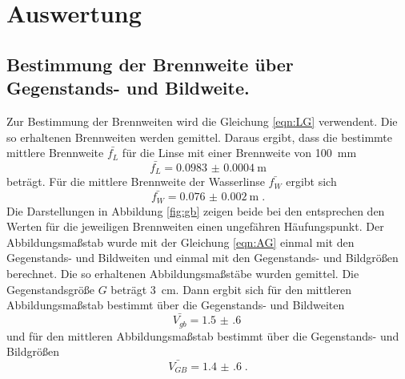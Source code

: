 \section{Auswertung}
\label{sec:Auswertung}
\subsection{Bestimmung der Brennweite über Gegenstands- und Bildweite.}
Zur Bestimmung der Brennweiten wird die Gleichung \eqref{eqn:LG} verwendent.
Die so erhaltenen Brennweiten werden gemittel. Daraus ergibt, dass die bestimmte
mittlere Brennweite $ \bar{f_{L}}$ für die Linse mit einer Brennweite von \SI{100}{\milli\meter}
\begin{equation*}
  \bar{f_{L}} = \SI{0.0983(4)}{\meter}
\end{equation*}
beträgt. Für die mittlere Brennweite der Wasserlinse $ \bar{f_{W}}$ ergibt
sich
\begin{equation*}
  \bar{f_{W}} = \SI{0.076(2)}{\meter} \; .
\end{equation*}
Die Darstellungen in Abbildung \ref{fig:gb} zeigen beide bei den entsprechen
den Werten für die jeweiligen Brennweiten einen ungefähren Häufungspunkt.
Der Abbildungsmaßstab wurde mit der Gleichung \eqref{eqn:AG} einmal mit
den Gegenstands- und Bildweiten und einmal mit den Gegenstands- und Bildgrößen
berechnet. Die so erhaltenen Abbildungsmaßstäbe wurden gemittel.
Die Gegenstandsgröße $G$ beträgt \SI{3}{\centi\meter}.
Dann ergbit sich für den mittleren Abbildungsmaßstab bestimmt über die
Gegenstands- und Bildweiten
\begin{equation*}
  \bar{V_{gb}} = \SI{1.5(6)}{}
\end{equation*}
und für den mittleren Abbildungsmaßstab bestimmt über die Gegenstands- und Bildgrößen
\begin{equation*}
  \bar{V_{GB}} = \SI{1.4(6)} \; .
\end{equation*}


